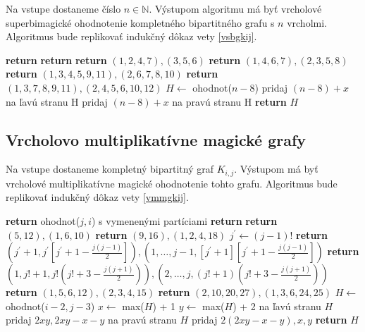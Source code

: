 \begin{alg}
\label{algvsbgkij}
Na vstupe dostaneme číslo $n \in \mathbb{N}$. Výstupom algoritmu má byť vrcholové superbimagické ohodnotenie kompletného bipartitného grafu s $n$ vrcholmi. Algoritmus bude replikovať indukčný dôkaz vety \ref{vsbgkij}.
\end{alg}

\begin{algorithmic}
	\STATE \textbf{return}
\ENDIF
{}
	\STATE \textbf{return}
\ENDIF
{}
	\STATE \textbf{return} $(1, 2, 4, 7), (3, 5, 6)$
\ENDIF
{}
	\STATE \textbf{return} $(1, 4, 6, 7), (2, 3, 5, 8)$
\ENDIF
{}
	\STATE \textbf{return} $(1, 3, 4, 5, 9, 11), (2, 6, 7, 8, 10)$
\ENDIF
{}
	\STATE \textbf{return} $(1, 3, 7, 8, 9, 11), (2, 4, 5, 6, 10, 12)$
\ENDIF
\STATE $H \gets$ ohodnot($n - 8$)
		\STATE pridaj $(n-8)+x$ na ľavú stranu H
	\ELSE
		\STATE pridaj $(n-8)+x$ na pravú stranu H
	\ENDIF
\ENDFOR
\STATE \textbf{return} $H$
\end{algorithmic}

\subsection{Vrcholovo multiplikatívne magické grafy}

\begin{alg}
\label{algvmmgkij}
Na vstupe dostaneme kompletný bipartitný graf $K_{i,j}$. Výstupom má byť vrcholové multiplikatívne magické ohodnotenie tohto grafu. Algoritmus bude replikovať indukčný dôkaz vety \ref{vmmgkij}.
\end{alg}

\begin{algorithmic}
	\STATE \textbf{return} ohodnot($j,i$) s vymenenými partíciami
\ENDIF
{}
	\STATE \textbf{return}
\ENDIF
{}
	\STATE \textbf{return} $(5, 12), (1, 6, 10)$
\ENDIF
{}
	\STATE \textbf{return} $(9, 16), (1, 2, 4, 18)$
\ENDIF
{}
	\STATE $j^\prime \gets (j - 1)!$
	\STATE \textbf{return} $(j^\prime + 1, j^\prime [j^\prime + 1 - \frac{j(j-1)}{2}] ), (1, \dots , j-1, [j^\prime + 1] [j^\prime + 1 - \frac{j(j-1)}{2}] )$
\ENDIF
{}
	\STATE \textbf{return} $(1, j! + 1, j! (j! + 3 - \frac{j(j+1)}{2}) ), (2, \dots , j, (j! + 1) (j! + 3 - \frac{j(j+1)}{2}))$
\ENDIF
{}
	\STATE \textbf{return} $(1, 5, 6, 12), (2, 3, 4, 15)$
\ENDIF
{}
	\STATE \textbf{return} $(2, 10, 20, 27), (1, 3, 6, 24, 25)$
\ENDIF
\STATE $H \gets$ ohodnot($i - 2, j - 3$)
\STATE $x \gets$ max($H$) + 1
\STATE $y \gets$ max($H$) + 2
\STATE na ľavú stranu $H$ pridaj $2xy, 2xy - x - y$
\STATE na pravú stranu $H$ pridaj $2(2xy - x - y), x, y$
\STATE \textbf{return} $H$
\end{algorithmic}

